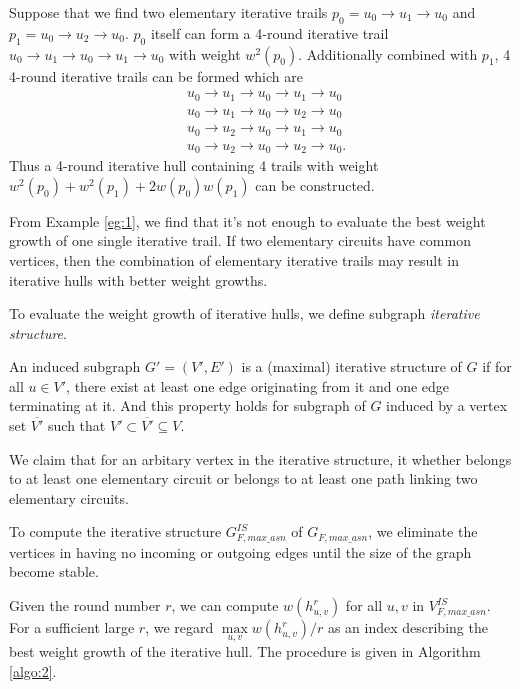 \begin{example}\label{eg:1}
	Suppose that we find two elementary iterative trails $p_0=u_0\rightarrow u_1\rightarrow u_0$ and $p_1=u_0\rightarrow u_2 \rightarrow u_0$. $p_0$ itself can form a 4-round iterative trail $u_0\rightarrow u_1\rightarrow u_0\rightarrow u_1\rightarrow u_0$ with weight $w^2(p_0)$. Additionally combined with $p_1$, 4 4-round iterative trails can be formed which are
	\begin{align*}
		&u_0\rightarrow u_1\rightarrow u_0\rightarrow u_1\rightarrow u_0\\
		&u_0\rightarrow u_1\rightarrow u_0\rightarrow u_2\rightarrow u_0\\
		&u_0\rightarrow u_2\rightarrow u_0\rightarrow u_1\rightarrow u_0\\
		&u_0\rightarrow u_2\rightarrow u_0\rightarrow u_2\rightarrow u_0.
	\end{align*}
	Thus a 4-round iterative hull containing 4 trails with weight $w^2(p_0)+w^2(p_1)+2w(p_0)w(p_1)$ can be constructed.
\end{example}

From Example \ref{eg:1}, we find that it's not enough to evaluate the best weight growth of one single iterative trail. If two elementary circuits have common vertices, then the combination of elementary iterative trails may result in iterative hulls with better weight growths.  

To evaluate the weight growth of iterative hulls, we define subgraph \textit{iterative structure}. 

\begin{definition}
	An induced subgraph $G'=(V',E')$ is a (maximal) iterative structure of $G$ if for all $u\in V'$, there exist at least one edge originating from it and one edge terminating at it. And this property holds for subgraph of $G$ induced by a vertex set $\overline{V'}$ such that $V' \subset \overline{V'} \subseteq V$.
\end{definition}

We claim that for an arbitary vertex in the iterative structure, it whether belongs to at least one elementary circuit or belongs to at least one path linking two elementary circuits. 

To compute the iterative structure $G^{IS}_{F,max\_asn}$ of $G_{F,max\_asn}$, we eliminate the vertices in having no incoming or outgoing edges until the size of the graph become stable. 

Given the round number $r$, we can compute $w(h_{u,v}^r)$ for all $u,v$ in $V^{IS}_{F,max\_asn}$. For a sufficient large $r$, we regard $\max\limits_{u,v}w(h_{u,v}^r)/r$ as an index describing the best weight growth of the iterative hull. The procedure is given in Algorithm \ref{algo:2}.

